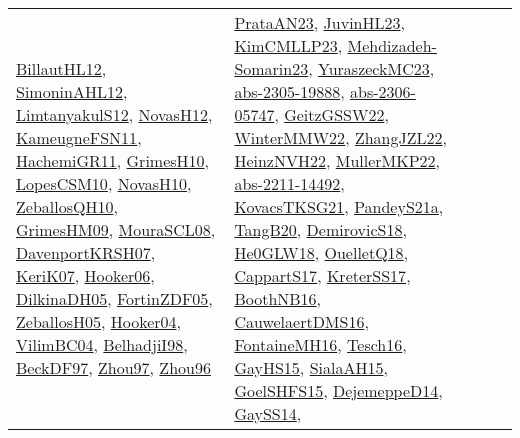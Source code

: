 {\begin{longtable}{llp{6cm}p{6cm}p{6cm}}
\href{papers/BillautHL12.pdf}{BillautHL12}\cite{BillautHL12}, \href{papers/SimoninAHL12.pdf}{SimoninAHL12}\cite{SimoninAHL12}, \href{articles/LimtanyakulS12.pdf}{LimtanyakulS12}\cite{LimtanyakulS12}, \href{articles/NovasH12.pdf}{NovasH12}\cite{NovasH12}, \href{papers/KameugneFSN11.pdf}{KameugneFSN11}\cite{KameugneFSN11}, \href{articles/HachemiGR11.pdf}{HachemiGR11}\cite{HachemiGR11}, \href{papers/GrimesH10.pdf}{GrimesH10}\cite{GrimesH10}, \href{articles/LopesCSM10.pdf}{LopesCSM10}\cite{LopesCSM10}, \href{articles/NovasH10.pdf}{NovasH10}\cite{NovasH10}, \href{articles/ZeballosQH10.pdf}{ZeballosQH10}\cite{ZeballosQH10}, \href{papers/GrimesHM09.pdf}{GrimesHM09}\cite{GrimesHM09}, \href{papers/MouraSCL08.pdf}{MouraSCL08}\cite{MouraSCL08}, \href{papers/DavenportKRSH07.pdf}{DavenportKRSH07}\cite{DavenportKRSH07}, \href{papers/KeriK07.pdf}{KeriK07}\cite{KeriK07}, \href{articles/Hooker06.pdf}{Hooker06}\cite{Hooker06}, \href{papers/DilkinaDH05.pdf}{DilkinaDH05}\cite{DilkinaDH05}, \href{papers/FortinZDF05.pdf}{FortinZDF05}\cite{FortinZDF05}, \href{articles/ZeballosH05.pdf}{ZeballosH05}\cite{ZeballosH05}, \href{papers/Hooker04.pdf}{Hooker04}\cite{Hooker04}, \href{papers/VilimBC04.pdf}{VilimBC04}\cite{VilimBC04}, \href{articles/BelhadjiI98.pdf}{BelhadjiI98}\cite{BelhadjiI98}, \href{papers/BeckDF97.pdf}{BeckDF97}\cite{BeckDF97}, \href{articles/Zhou97.pdf}{Zhou97}\cite{Zhou97}, \href{papers/Zhou96.pdf}{Zhou96}\cite{Zhou96} & \href{articles/PrataAN23.pdf}{PrataAN23}\cite{PrataAN23}, \href{papers/JuvinHL23.pdf}{JuvinHL23}\cite{JuvinHL23}, \href{papers/KimCMLLP23.pdf}{KimCMLLP23}\cite{KimCMLLP23}, \href{papers/Mehdizadeh-Somarin23.pdf}{Mehdizadeh-Somarin23}\cite{Mehdizadeh-Somarin23}, \href{papers/YuraszeckMC23.pdf}{YuraszeckMC23}\cite{YuraszeckMC23}, \href{articles/abs-2305-19888.pdf}{abs-2305-19888}\cite{abs-2305-19888}, \href{articles/abs-2306-05747.pdf}{abs-2306-05747}\cite{abs-2306-05747}, \href{papers/GeitzGSSW22.pdf}{GeitzGSSW22}\cite{GeitzGSSW22}, \href{papers/WinterMMW22.pdf}{WinterMMW22}\cite{WinterMMW22}, \href{papers/ZhangJZL22.pdf}{ZhangJZL22}\cite{ZhangJZL22}, \href{articles/HeinzNVH22.pdf}{HeinzNVH22}\cite{HeinzNVH22}, \href{articles/MullerMKP22.pdf}{MullerMKP22}\cite{MullerMKP22}, \href{articles/abs-2211-14492.pdf}{abs-2211-14492}\cite{abs-2211-14492}, \href{papers/KovacsTKSG21.pdf}{KovacsTKSG21}\cite{KovacsTKSG21}, \href{articles/PandeyS21a.pdf}{PandeyS21a}\cite{PandeyS21a}, \href{papers/TangB20.pdf}{TangB20}\cite{TangB20}, \href{papers/DemirovicS18.pdf}{DemirovicS18}\cite{DemirovicS18}, \href{papers/He0GLW18.pdf}{He0GLW18}\cite{He0GLW18}, \href{papers/OuelletQ18.pdf}{OuelletQ18}\cite{OuelletQ18}, \href{papers/CappartS17.pdf}{CappartS17}\cite{CappartS17}, \href{articles/KreterSS17.pdf}{KreterSS17}\cite{KreterSS17}, \href{papers/BoothNB16.pdf}{BoothNB16}\cite{BoothNB16}, \href{papers/CauwelaertDMS16.pdf}{CauwelaertDMS16}\cite{CauwelaertDMS16}, \href{papers/FontaineMH16.pdf}{FontaineMH16}\cite{FontaineMH16}, \href{papers/Tesch16.pdf}{Tesch16}\cite{Tesch16}, \href{papers/GayHS15.pdf}{GayHS15}\cite{GayHS15}, \href{papers/SialaAH15.pdf}{SialaAH15}\cite{SialaAH15}, \href{articles/GoelSHFS15.pdf}{GoelSHFS15}\cite{GoelSHFS15}, \href{papers/DejemeppeD14.pdf}{DejemeppeD14}\cite{DejemeppeD14}, \href{papers/GaySS14.pdf}{GaySS14}\cite{GaySS14}, 
\end{longtable}}
